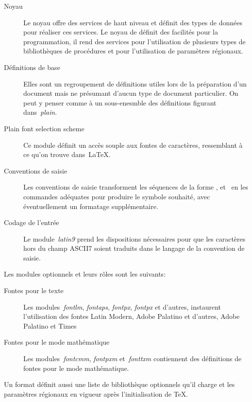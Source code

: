 \begin{description}

\item[Noyau]
Le noyau offre des services de haut niveau et définit des types de
données pour réaliser ces services. Le noyau de {\brTeX} définit des
facilités pour la programmation, il rend des services pour
l'utilisation de plusieurs types de bibliothèques de procédures et
pour l'utilisation de paramètres régionaux.

\item[Définitions de base]
Elles sont un regroupement de définitions utiles lors de la
préparation d'un document mais ne présumant d'aucun type de document
particulier.  On peut y penser comme à un sous-enesmble des
définitions figurant dans~\emph{plain}.

\item[Plain font selection scheme]
Ce module définit un accès souple aux fontes de caractères,
ressemblant à ce qu'on trouve dans~{\LaTeX}.

\item[Conventions de saisie]
Les conventions de saisie transforment les séquences de la
forme ,  et~ en
les commandes adéquates pour produire le symbole souhaité, avec
éventuellement un formatage supplémentaire.

\item[Codage de l'entrée]
Le module~\emph{latin9} prend les dispositions nécessaires
pour que les caractères hors du
champ ASCII7 soient traduits dans le langage de la convention
de saisie.

\end{description}


Les modules optionnels et leurs rôles sont les suivants:

\begin{description}
\item[Fontes pour le texte]
Les modules~\emph{fontlm}, \emph{fontaps}, \emph{fontpx}, \emph{fontpx}
et d'autres, instaurent l'utilisation des fontes Latin Modern, Adobe
Palatino et d'autres, Adobe Palatino et Times
\item[Fontes pour le mode mathématique]
Les modules~\emph{fontcmm}, \emph{fontpxm} et~\emph{fonttxm}
contiennent des définitions de fontes pour le mode mathématique.
\end{description}

Un format définit aussi une liste de bibliothèque optionnels qu'il
charge et les paramètres régionaux en vigueur après l'initialisation
de {\TeX}.

